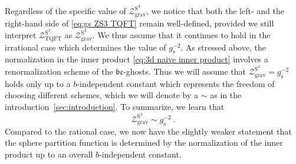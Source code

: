 \documentclass[12pt,a4paper]{article}
\newcommand{\be}{\begin{equation}}
\newcommand{\ee}{\end{equation}}
\begin{document}
Regardless of the specific value of $\mathcal{Z}_{\text{grav}}^{\text{S}^3}$, we notice that both the left- and the right-hand side of \eqref{eq:gs ZS3 TQFT} remain well-defined, provided we still interpret $\mathcal{Z}_{\text{TQFT}}^{\text{S}^3}$ as $\mathcal{Z}_{\text{grav}}^{\text{S}^3}$. We thus assume that it continues to hold in the irrational case which determines the value of $g_\text{s}^{-2}$. As stressed above, the normalization in the inner product \eqref{eq:3d naive inner product} involves a renormalization scheme of the $\mathfrak{bc}$-ghosts. Thus we will assume that $\mathcal{Z}_{\text{grav}}^{\text{S}^3}=g_\text{s}^{-2}$ holds only up to a $b$-independent constant which represents the freedom of choosing different schemes, which we will denote by a $\sim$ as in the introduction~\ref{sec:introduction}. To summarize, we learn that
\be 
\mathcal{Z}_{\text{grav}}^{\text{S}^3} \sim g_\text{s}^{-2}~. \label{eq:three sphere partition function string coupling}
\ee
Compared to the rational case, we now have the slightly weaker statement that the sphere partition function is determined by the normalization of the inner product up to an overall $b$-independent constant. 
\end{document}
